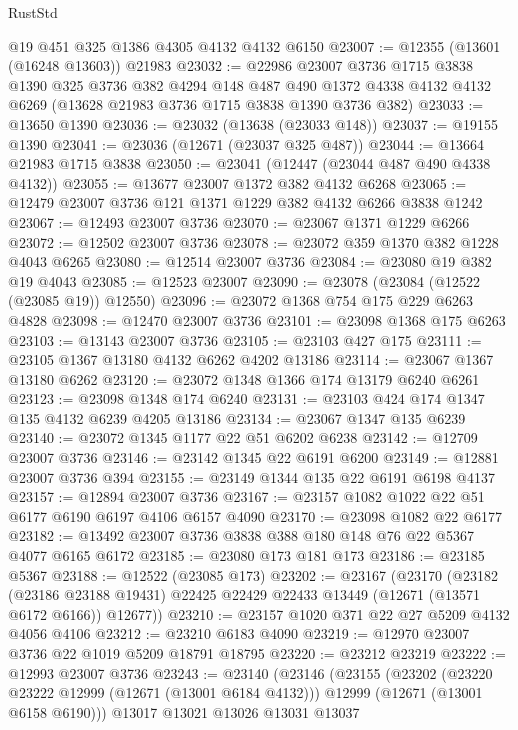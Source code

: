 \begin{lexlean}{RustStd}
\begin{coremodule}
    @19
    @451
    @325
    @1386
    @4305
    @4132
    @4132
    @6150
@23007 := @12355 (@13601 (@16248 @13603)) @21983
@23032 := @22986
    @23007
    @3736
    @1715
    @3838
    @1390
    @325
    @3736
    @382
    @4294
    @148
    @487
    @490
    @1372
    @4338
    @4132
    @4132
    @6269
    (@13628 @21983 @3736 @1715 @3838 @1390 @3736 @382)
@23033 := @13650 @1390
@23036 := @23032 (@13638 (@23033 @148))
@23037 := @19155 @1390
@23041 := @23036 (@12671 (@23037 @325 @487))
@23044 := @13664 @21983 @1715 @3838
@23050 := @23041 (@12447 (@23044 @487 @490 @4338 @4132))
@23055 := @13677 @23007 @1372 @382 @4132 @6268
@23065 := @12479 @23007 @3736 @121 @1371 @1229 @382 @4132 @6266 @3838 @1242
@23067 := @12493 @23007 @3736
@23070 := @23067 @1371 @1229 @6266
@23072 := @12502 @23007 @3736
@23078 := @23072 @359 @1370 @382 @1228 @4043 @6265
@23080 := @12514 @23007 @3736
@23084 := @23080 @19 @382 @19 @4043
@23085 := @12523 @23007
@23090 := @23078 (@23084 (@12522 (@23085 @19)) @12550)
@23096 := @23072 @1368 @754 @175 @229 @6263 @4828
@23098 := @12470 @23007 @3736
@23101 := @23098 @1368 @175 @6263
@23103 := @13143 @23007 @3736
@23105 := @23103 @427 @175
@23111 := @23105 @1367 @13180 @4132 @6262 @4202 @13186
@23114 := @23067 @1367 @13180 @6262
@23120 := @23072 @1348 @1366 @174 @13179 @6240 @6261
@23123 := @23098 @1348 @174 @6240
@23131 := @23103 @424 @174 @1347 @135 @4132 @6239 @4205 @13186
@23134 := @23067 @1347 @135 @6239
@23140 := @23072 @1345 @1177 @22 @51 @6202 @6238
@23142 := @12709 @23007 @3736
@23146 := @23142 @1345 @22 @6191 @6200
@23149 := @12881 @23007 @3736 @394
@23155 := @23149 @1344 @135 @22 @6191 @6198 @4137
@23157 := @12894 @23007 @3736
@23167 := @23157 @1082 @1022 @22 @51 @6177 @6190 @6197 @4106 @6157 @4090
@23170 := @23098 @1082 @22 @6177
@23182 := @13492 @23007 @3736 @3838 @388 @180 @148 @76 @22 @5367 @4077 @6165 @6172
@23185 := @23080 @173 @181 @173
@23186 := @23185 @5367
@23188 := @12522 (@23085 @173)
@23202 := @23167
    (@23170
      (@23182
        (@23186 @23188 @19431)
        @22425
        @22429
        @22433
        @13449
        (@12671 (@13571 @6172 @6166))
        @12677))
@23210 := @23157 @1020 @371 @22 @27 @5209 @4132 @4056 @4106
@23212 := @23210 @6183 @4090
@23219 := @12970 @23007 @3736 @22 @1019 @5209 @18791 @18795
@23220 := @23212 @23219
@23222 := @12993 @23007 @3736
@23243 := @23140
    (@23146
      (@23155
        (@23202
          (@23220 @23222 @12999 (@12671 (@13001 @6184 @4132)))
          @12999
          (@12671 (@13001 @6158 @6190)))
        @13017
        @13021
        @13026
        @13031
        @13037

\end{coremodule}
\end{lexlean}

